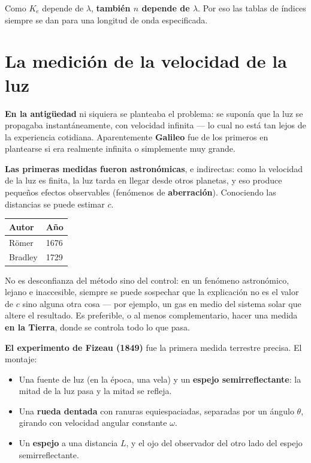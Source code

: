 \documentclass[12pt,a4paper]{article}
\begin{document}
Como $K_e$ depende de $\lambda$, \textbf{también $n$ depende de $\lambda$}. Por
eso las tablas de índices siempre se dan para una longitud de onda especificada.

\section{La medición de la velocidad de la luz}

\textbf{En la antigüedad} ni siquiera se planteaba el problema: se suponía que la
luz se propagaba instantáneamente, con velocidad infinita --- lo cual no está tan
lejos de la experiencia cotidiana. Aparentemente \textbf{Galileo} fue de los
primeros en plantearse si era realmente infinita o simplemente muy grande.

\textbf{Las primeras medidas fueron astronómicas}, e indirectas: como la velocidad
de la luz es finita, la luz tarda en llegar desde otros planetas, y eso produce
pequeños efectos observables (fenómenos de \textbf{aberración}). Conociendo las
distancias se puede estimar $c$.

\begin{table}[H]
\centering
\begin{tabular}{ll}
\toprule
\textbf{Autor} & \textbf{Año} \\
\midrule
Römer   & 1676 \\
Bradley & 1729 \\
\bottomrule
\end{tabular}
\end{table}

\begin{warnbox}
No es desconfianza del método sino del control: en un fenómeno astronómico, lejano
e inaccesible, siempre se puede sospechar que la explicación no es el valor de $c$
sino alguna otra cosa --- por ejemplo, un gas en medio del sistema solar que
altere el resultado. Es preferible, o al menos complementario, hacer una medida
\textbf{en la Tierra}, donde se controla todo lo que pasa.
\end{warnbox}

\textbf{El experimento de Fizeau (1849)} fue la primera medida terrestre precisa.
El montaje:

\begin{itemize}
  \item Una fuente de luz (en la época, una vela) y un \textbf{espejo
        semirreflectante}: la mitad de la luz pasa y la mitad se refleja.
  \item Una \textbf{rueda dentada} con ranuras equiespaciadas, separadas por un
        ángulo $\theta$, girando con velocidad angular constante $\omega$.
  \item Un \textbf{espejo} a una distancia $L$, y el ojo del observador del otro
        lado del espejo semirreflectante.
\end{itemize}
\end{document}
